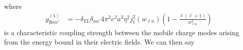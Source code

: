 \documentclass{article}
\begin{document}
where
\begin{equation}
\begin{split}
g_{\bm{\beta}nn'}^{(1)} 
&= -\delta_{TL}\delta_{nn'}4\pi^2e^2a^3\eta^2j_\ell^2(w_{\ell n})\left(1 - \frac{\ell(\ell + 1)}{w_{\ell n}^2}\right)
\end{split}
\end{equation}
is a characteristic coupling strength between the mobile charge modes arising from the energy bound in their electric fields. We can then say
\end{document}
